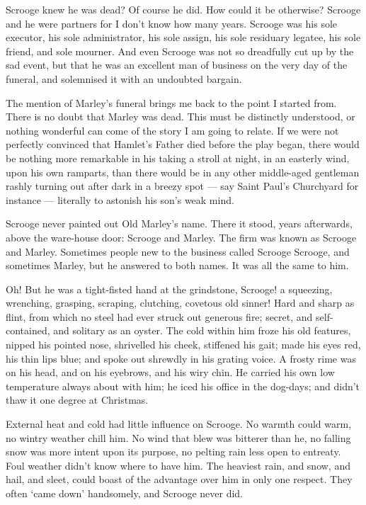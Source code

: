 \documentclass[11pt,twoside]{article}\makeatletter
\begin{document}
Scrooge knew he was dead?  Of course he did.  How could it be otherwise?  Scrooge and he were partners for I don't know how many years.  Scrooge was his sole executor, his sole administrator, his sole assign, his sole residuary legatee, his sole friend, and sole mourner.  And even Scrooge was not so dreadfully cut up by the sad event, but that he was an excellent man of business on the very day of the funeral, and solemnised it with an undoubted bargain.  \par
The mention of Marley's funeral brings me back to the point I started from.  There is no doubt that Marley was dead.  This must be distinctly understood, or nothing wonderful can come of the story I am going to relate.  If we were not perfectly convinced that Hamlet's Father died before the play began, there would be nothing more remarkable in his taking a stroll at night, in an easterly wind, upon his own ramparts, than there   would be in any other middle-aged gentleman rashly  turning out after dark in a breezy spot — say Saint  Paul's Churchyard for instance — literally to astonish his son's weak mind.  \par
Scrooge never painted out Old Marley's name.  There it stood, years afterwards, above the ware-house door: Scrooge and Marley.  The firm was known as Scrooge and Marley. Sometimes people new to the business called Scrooge Scrooge, and sometimes Marley, but he answered to both names.  It was all the same to him.  \par
Oh!  But he was a tight-fisted hand at the grindstone, Scrooge!  a squeezing, wrenching, grasping, scraping, clutching, covetous old sinner!  Hard and sharp as flint, from which no steel had ever struck out generous fire; secret, and self-contained, and solitary as an oyster.  The cold within him froze his old features, nipped his pointed nose, shrivelled his cheek, stiffened his gait; made his eyes red, his thin lips blue; and spoke out shrewdly in his grating voice.  A frosty rime was on his head, and on his eyebrows, and his wiry chin. He   carried his own low temperature always about with him; he iced his office in the dog-days; and didn't thaw it one degree at Christmas.  \par
External heat and cold had little influence on Scrooge. No warmth could warm, no wintry weather chill him.  No wind that blew was bitterer than he, no falling snow was more intent upon its purpose, no pelting rain less open to entreaty. Foul weather didn't know where to have him.  The heaviest rain, and snow, and hail, and sleet, could boast of the advantage over him in only one respect.  They often ‘came down’ handsomely, and Scrooge never did.  \par
\end{document}
